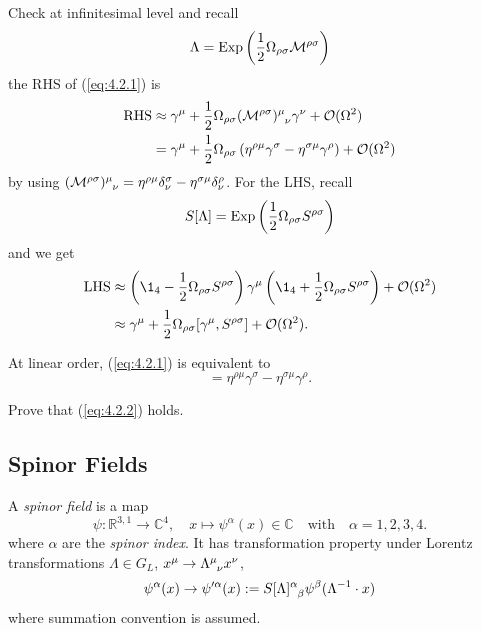 \documentclass[a4paper,11pt]{article}
\begin{document}
	Check at infinitesimal level and recall
	\[
		\Lambda = \operatorname{Exp} \left( \frac{1}{2} \Omega _{\rho \sigma} \mathcal{M}^{\rho \sigma} \right)
	\]
	the RHS of (\ref{eq:4.2.1}) is 
	\begin{align*}
		\text{RHS} &\approx \gamma^\mu + \frac{1}{2} \Omega _{\rho \sigma} (\mathcal{M}^{\rho \sigma})\indices{^\mu _\nu} \gamma^\nu + \mathcal{O}(\Omega^2)\\
		& = \gamma^\mu + \frac{1}{2} \Omega _{\rho \sigma} \left( \eta ^{\rho \mu} \gamma^\sigma - \eta ^{\sigma \mu} \gamma^\rho \right) + \mathcal{O}(\Omega^2)
	\end{align*}
	by using $(\mathcal{M}^{\rho \sigma})\indices{^\mu_\nu} = \eta ^{\rho \mu}\delta^\sigma_\nu - \eta ^{\sigma \mu} \delta^\rho_\nu$. For the LHS, recall 
	\[
		S[\Lambda] = \operatorname{Exp} \left( \frac{1}{2} \Omega _{\rho \sigma} S ^{\rho \sigma} \right)
	\]
	and we get 
	\begin{align*}
		\text{LHS} & \approx \left( \1_4 - \frac{1}{2} \Omega _{\rho \sigma} S ^{\rho \sigma} \right) \gamma^\mu \left( \1_4 + \frac{1}{2} \Omega _{\rho \sigma} S ^{\rho \sigma} \right) + \mathcal{O}(\Omega^2)\\
		& \approx \gamma^\mu + \frac{1}{2} \Omega _{\rho \sigma} [\gamma^\mu, S ^{\rho \sigma}] + \mathcal{O}(\Omega^2).
	\end{align*}
	
	At linear order, (\ref{eq:4.2.1}) is equivalent to 
	\begin{equation}
		[\gamma^\mu , S ^{\rho \sigma}] = \eta ^{\rho \mu} \gamma^\sigma - \eta ^{\sigma \mu} \gamma^\rho.
		\label{eq:4.2.2}
	\end{equation}

	\begin{exer}
		Prove that (\ref{eq:4.2.2}) holds.
	\end{exer}

	\subsection{Spinor Fields}

	\begin{defi}
		A \emph{spinor field} is a map 
		\[
			\psi : \mathbb{R} ^{3,1} \to \mathbb{C}^4, \quad x \mapsto \psi^\alpha (x) \in \mathbb{C} \quad \text{with} \quad \alpha = 1,2,3,4.
		\]
		where $\alpha$ are the \emph{spinor index}. It has transformation property under Lorentz transformations $\Lambda \in G_L$, $x^\mu \to \LT{\mu}{\nu}x^\nu$, 
		\begin{equation}
			\psi^\alpha (x) \to \psi'^\alpha (x) := S[\Lambda]\indices{^\alpha_\beta} \psi^\beta(\Lambda^{-1} \cdot x)
			\label{eq:4.3.1}
		\end{equation}
		where summation convention is assumed. 
	\end{defi}
\end{document}
